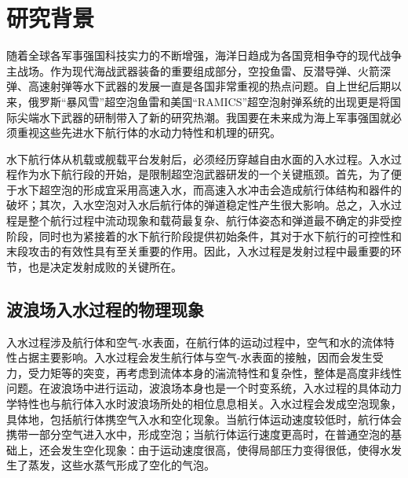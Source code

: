 \chapter{研究背景}

随着全球各军事强国科技实力的不断增强，海洋日趋成为各国竞相争夺的现代战争主战场。作为现代海战武器装备的重要组成部分，空投鱼雷、反潜导弹、火箭深弹、高速射弹等水下武器的发展一直是各国非常重视的热点问题。自上世纪后期以来，俄罗斯“暴风雪”超空泡鱼雷和美国“RAMICS”超空泡射弹系统的出现更是将国际尖端水下武器的研制带入了新的研究热潮。我国要在未来成为海上军事强国就必须重视这些先进水下航行体的水动力特性和机理的研究。

水下航行体从机载或舰载平台发射后，必须经历穿越自由水面的入水过程。入水过程作为水下航行段的开始，是限制超空泡武器研发的一个关键瓶颈。首先，为了便于水下超空泡的形成宜采用高速入水，而高速入水冲击会造成航行体结构和器件的破坏；其次，入水空泡对入水后航行体的弹道稳定性产生很大影响。总之，入水过程是整个航行过程中流动现象和载荷最复杂、航行体姿态和弹道最不确定的非受控阶段，同时也为紧接着的水下航行阶段提供初始条件，其对于水下航行的可控性和末段攻击的有效性具有至关重要的作用。因此，入水过程是发射过程中最重要的环节，也是决定发射成败的关键所在。

\section{波浪场入水过程的物理现象}

入水过程涉及航行体和空气-水表面，在航行体的运动过程中，空气和水的流体特性占据主要影响。入水过程会发生航行体与空气-水表面的接触，因而会发生受力，受力矩等的突变，再考虑到流体本身的湍流特性和复杂性，整体是高度非线性问题。在波浪场中进行运动，波浪场本身也是一个时变系统，入水过程的具体动力学特性也与航行体入水时波浪场所处的相位息息相关。入水过程会发成空泡现象\cite{young1999cavitation,truscott2014water}，具体地，包括航行体携空气入水和空化现象。当航行体运动速度较低时，航行体会携带一部分空气进入水中，形成空泡；当航行体运行速度更高时，在普通空泡的基础上，还会发生空化现象：由于运动速度很高，使得局部压力变得很低，使得水发生了蒸发，这些水蒸气形成了空化的气泡。

